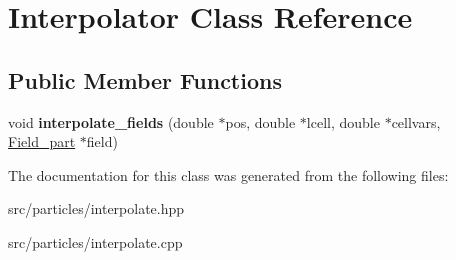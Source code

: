 \hypertarget{class_interpolator}{}\section{Interpolator Class Reference}
\label{class_interpolator}
\subsection*{Public Member Functions}
\begin{DoxyCompactItemize}
\item 
\hypertarget{class_interpolator_a49a4b201268136f4a17f14f7e3ddc542}{}\label{class_interpolator_a49a4b201268136f4a17f14f7e3ddc542} 
void {\bfseries interpolate\+\_\+fields} (double $\ast$pos, double $\ast$lcell, double $\ast$cellvars, \hyperlink{struct_field__part}{Field\+\_\+part} $\ast$field)
\end{DoxyCompactItemize}


The documentation for this class was generated from the following files\+:\begin{DoxyCompactItemize}
\item 
src/particles/interpolate.\+hpp\item 
src/particles/interpolate.\+cpp\end{DoxyCompactItemize}
